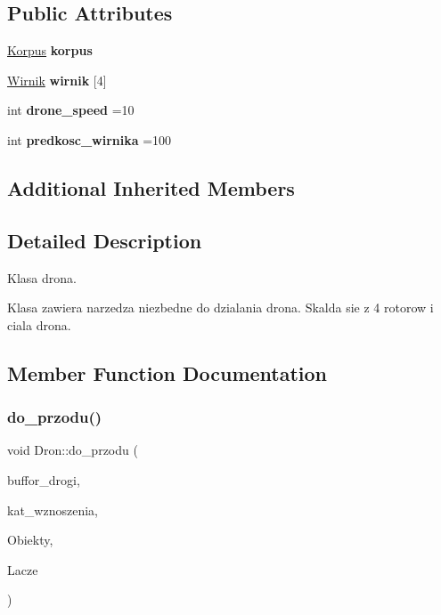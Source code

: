 \subsection*{Public Attributes}
\begin{DoxyCompactItemize}
\item 
\mbox{\label{class_dron_a4a989f34daeab01e3d8dbca7ad5122d1}} 
\mbox{\hyperlink{class_korpus}{Korpus}} {\bfseries korpus}
\item 
\mbox{\label{class_dron_a7ae96f5085b1ea76537d0a5c9d3adf62}} 
\mbox{\hyperlink{class_wirnik}{Wirnik}} {\bfseries wirnik} \mbox{[}4\mbox{]}
\item 
\mbox{\label{class_dron_af92cb586efd46bb3b13463386900342d}} 
int {\bfseries drone\+\_\+speed} =10
\item 
\mbox{\label{class_dron_a576353aecbb461025976352cae99133c}} 
int {\bfseries predkosc\+\_\+wirnika} =100
\end{DoxyCompactItemize}
\subsection*{Additional Inherited Members}


\subsection{Detailed Description}
Klasa drona. 

Klasa zawiera narzedza niezbedne do dzialania drona. Skalda sie z 4 rotorow i ciala drona. 

\subsection{Member Function Documentation}
\mbox{\label{class_dron_a9c676445fe100adedc65c65ea2f98866}} 
\subsubsection{\texorpdfstring{do\_przodu()}{do\_przodu()}}
{\footnotesize\ttfamily void Dron\+::do\+\_\+przodu (\begin{DoxyParamCaption}\item[{const double \&}]{buffor\+\_\+drogi,  }\item[{const double \&}]{kat\+\_\+wznoszenia,  }\item[{std\+::list$<$ std\+::shared\+\_\+ptr$<$ \mbox{\hyperlink{class_obiekt__sceny}{Obiekt\+\_\+sceny}} $>$$>$ \&}]{Obiekty,  }\item[{\mbox{\hyperlink{class_pz_g_1_1_lacze_do_g_n_u_plota}{Pz\+G\+::\+Lacze\+Do\+G\+N\+U\+Plota}}}]{Lacze }\end{DoxyParamCaption})\hspace{0.3cm}{\ttfamily [inline]}}

